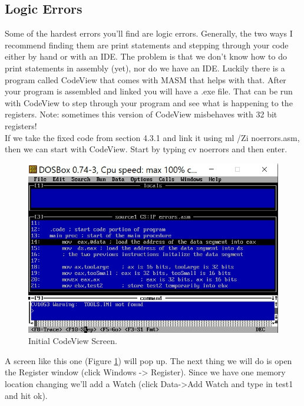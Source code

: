 \subsection{Logic Errors}
Some of the hardest errors you'll find are logic errors.  Generally, the two ways I recommend finding them are print statements and stepping through your code either by hand or with an IDE.  The problem is that we don't know how to do print statements in assembly (yet), nor do we have an IDE.  Luckily there is a program called CodeView that comes with MASM that helps with that.  After your program is assembled and linked you will have a .exe file.  That can be run with CodeView to step through your program and see what is happening to the registers.  Note: sometimes this version of CodeView misbehaves with 32 bit registers!  \\
\indent If we take the fixed code from section 4.3.1 and link it using {\code ml /Zi noerrors.asm}, then we can start with CodeView.  Start by typing {\code cv noerrors} and then enter.  
\begin{figure}
  \includegraphics[width=\linewidth]{images/firstCV.jpg}
  \caption{Initial CodeView Screen.}
  \label{fig:cv1}
\end{figure}
A screen like this one (Figure \ref{fig:cv1}) will pop up. 
The next thing we will do is open the Register window (click {\code Windows -> Register}).  Since we have one memory location changing we'll add a Watch (click {\code Data->Add Watch} and type in test1 and hit ok).  
